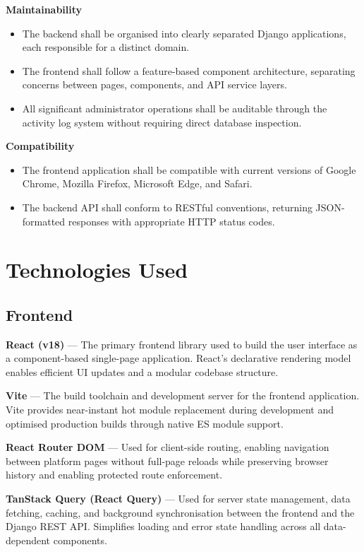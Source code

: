 \documentclass[12pt]{article}
\begin{document}
\textbf{Maintainability}

\begin{itemize}
  \item The backend shall be organised into clearly separated Django applications, each responsible for a distinct domain.
  \item The frontend shall follow a feature-based component architecture, separating concerns between pages, components, and API service layers.
  \item All significant administrator operations shall be auditable through the activity log system without requiring direct database inspection.
\end{itemize}

\textbf{Compatibility}

\begin{itemize}
  \item The frontend application shall be compatible with current versions of Google Chrome, Mozilla Firefox, Microsoft Edge, and Safari.
  \item The backend API shall conform to RESTful conventions, returning JSON-formatted responses with appropriate HTTP status codes.
\end{itemize}

\clearpage
\section{Technologies Used}

\subsection{Frontend}

\textbf{React (v18)} --- The primary frontend library used to build the user interface as a component-based single-page application. React's declarative rendering model enables efficient UI updates and a modular codebase structure.

\textbf{Vite} --- The build toolchain and development server for the frontend application. Vite provides near-instant hot module replacement during development and optimised production builds through native ES module support.

\textbf{React Router DOM} --- Used for client-side routing, enabling navigation between platform pages without full-page reloads while preserving browser history and enabling protected route enforcement.

\textbf{TanStack Query (React Query)} --- Used for server state management, data fetching, caching, and background synchronisation between the frontend and the Django REST API. Simplifies loading and error state handling across all data-dependent components.
\end{document}
